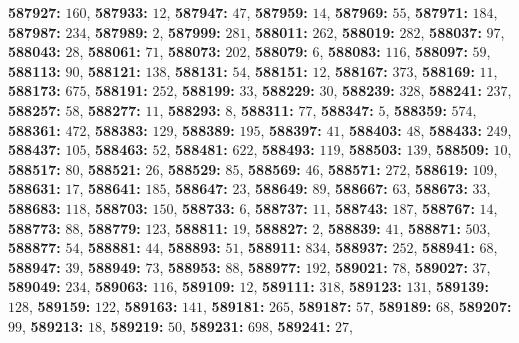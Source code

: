 \textsf{\bfseries 587927:} $160$, \textsf{\bfseries 587933:} $12$, \textsf{\bfseries 587947:} $47$, \textsf{\bfseries 587959:} $14$, \textsf{\bfseries 587969:} $55$, \textsf{\bfseries 587971:} $184$, \textsf{\bfseries 587987:} $234$, \textsf{\bfseries 587989:} $2$, \textsf{\bfseries 587999:} $281$, \textsf{\bfseries 588011:} $262$, \textsf{\bfseries 588019:} $282$, \textsf{\bfseries 588037:} $97$, \textsf{\bfseries 588043:} $28$, \textsf{\bfseries 588061:} $71$, \textsf{\bfseries 588073:} $202$, \textsf{\bfseries 588079:} $6$, \textsf{\bfseries 588083:} $116$, \textsf{\bfseries 588097:} $59$, \textsf{\bfseries 588113:} $90$, \textsf{\bfseries 588121:} $138$, \textsf{\bfseries 588131:} $54$, \textsf{\bfseries 588151:} $12$, \textsf{\bfseries 588167:} $373$, \textsf{\bfseries 588169:} $11$, \textsf{\bfseries 588173:} $675$, \textsf{\bfseries 588191:} $252$, \textsf{\bfseries 588199:} $33$, \textsf{\bfseries 588229:} $30$, \textsf{\bfseries 588239:} $328$, \textsf{\bfseries 588241:} $237$, \textsf{\bfseries 588257:} $58$, \textsf{\bfseries 588277:} $11$, \textsf{\bfseries 588293:} $8$, \textsf{\bfseries 588311:} $77$, \textsf{\bfseries 588347:} $5$, \textsf{\bfseries 588359:} $574$, \textsf{\bfseries 588361:} $472$, \textsf{\bfseries 588383:} $129$, \textsf{\bfseries 588389:} $195$, \textsf{\bfseries 588397:} $41$, \textsf{\bfseries 588403:} $48$, \textsf{\bfseries 588433:} $249$, \textsf{\bfseries 588437:} $105$, \textsf{\bfseries 588463:} $52$, \textsf{\bfseries 588481:} $622$, \textsf{\bfseries 588493:} $119$, \textsf{\bfseries 588503:} $139$, \textsf{\bfseries 588509:} $10$, \textsf{\bfseries 588517:} $80$, \textsf{\bfseries 588521:} $26$, \textsf{\bfseries 588529:} $85$, \textsf{\bfseries 588569:} $46$, \textsf{\bfseries 588571:} $272$, \textsf{\bfseries 588619:} $109$, \textsf{\bfseries 588631:} $17$, \textsf{\bfseries 588641:} $185$, \textsf{\bfseries 588647:} $23$, \textsf{\bfseries 588649:} $89$, \textsf{\bfseries 588667:} $63$, \textsf{\bfseries 588673:} $33$, \textsf{\bfseries 588683:} $118$, \textsf{\bfseries 588703:} $150$, \textsf{\bfseries 588733:} $6$, \textsf{\bfseries 588737:} $11$, \textsf{\bfseries 588743:} $187$, \textsf{\bfseries 588767:} $14$, \textsf{\bfseries 588773:} $88$, \textsf{\bfseries 588779:} $123$, \textsf{\bfseries 588811:} $19$, \textsf{\bfseries 588827:} $2$, \textsf{\bfseries 588839:} $41$, \textsf{\bfseries 588871:} $503$, \textsf{\bfseries 588877:} $54$, \textsf{\bfseries 588881:} $44$, \textsf{\bfseries 588893:} $51$, \textsf{\bfseries 588911:} $834$, \textsf{\bfseries 588937:} $252$, \textsf{\bfseries 588941:} $68$, \textsf{\bfseries 588947:} $39$, \textsf{\bfseries 588949:} $73$, \textsf{\bfseries 588953:} $88$, \textsf{\bfseries 588977:} $192$, \textsf{\bfseries 589021:} $78$, \textsf{\bfseries 589027:} $37$, \textsf{\bfseries 589049:} $234$, \textsf{\bfseries 589063:} $116$, \textsf{\bfseries 589109:} $12$, \textsf{\bfseries 589111:} $318$, \textsf{\bfseries 589123:} $131$, \textsf{\bfseries 589139:} $128$, \textsf{\bfseries 589159:} $122$, \textsf{\bfseries 589163:} $141$, \textsf{\bfseries 589181:} $265$, \textsf{\bfseries 589187:} $57$, \textsf{\bfseries 589189:} $68$, \textsf{\bfseries 589207:} $99$, \textsf{\bfseries 589213:} $18$, \textsf{\bfseries 589219:} $50$, \textsf{\bfseries 589231:} $698$, \textsf{\bfseries 589241:} $27$, 
